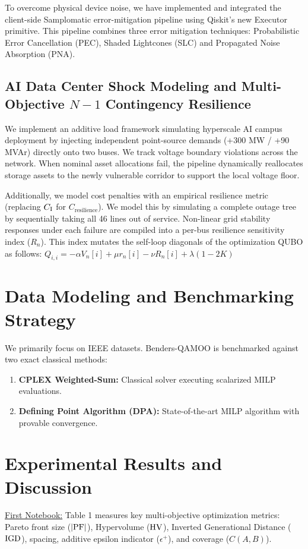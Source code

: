 \documentclass[11pt]{article}
\begin{document}
To overcome physical device noise, we have implemented and integrated the client-side Samplomatic error-mitigation pipeline using Qiskit's new Executor primitive. This pipeline combines three error mitigation techniques: Probabilistic Error Cancellation (PEC), Shaded Lightcones (SLC) and Propagated Noise Absorption (PNA).

\subsection{AI Data Center Shock Modeling and Multi-Objective $N-1$ Contingency Resilience}
We implement an additive load framework simulating hyperscale AI campus deployment by injecting independent point-source demands (+300 MW / +90 MVAr) directly onto two buses. We track voltage boundary violations across the network. When nominal asset allocations fail, the pipeline dynamically reallocates storage assets to the newly vulnerable corridor to support the local voltage floor.

Additionally, we model cost penalties with an empirical resilience metric (replacing $C_{\rm I}$ for $C_{\text{resilience}}$). We model this by simulating a complete outage tree by sequentially taking all 46 lines out of service. Non-linear grid stability responses under each failure are compiled into a per-bus resilience sensitivity index ($R_n$). This index mutates the self-loop diagonals of the optimization QUBO as follows:
$Q_{i,i} = -\alpha V_n[i] + \mu r_n[i] - \nu R_n[i] + \lambda(1 - 2K)$

\section{Data Modeling and Benchmarking Strategy}
We primarily focus on IEEE datasets. Benders-QAMOO is benchmarked against two exact classical methods:
\begin{enumerate}[leftmargin=*,noitemsep,topsep=0pt]
  \item \textbf{CPLEX Weighted-Sum:} Classical solver executing scalarized MILP evaluations.
  \item \textbf{Defining Point Algorithm (DPA):} State-of-the-art MILP algorithm with provable convergence.
\end{enumerate}

\section{Experimental Results and Discussion}
\underline{First Notebook:} Table 1 measures key multi-objective optimization metrics: Pareto front size ($|{\rm PF}|$), Hypervolume (${\rm HV}$), Inverted Generational Distance (${\rm IGD}$), spacing, additive epsilon indicator ($\epsilon^+$), and coverage ($C(A,B)$).
\end{document}
